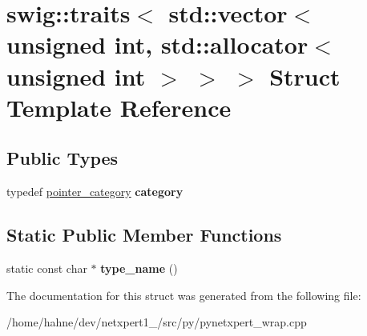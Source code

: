 \hypertarget{structswig_1_1traits_3_01std_1_1vector_3_01unsigned_01int_00_01std_1_1allocator_3_01unsigned_01int_01_4_01_4_01_4}{}\section{swig\+:\+:traits$<$ std\+:\+:vector$<$ unsigned int, std\+:\+:allocator$<$ unsigned int $>$ $>$ $>$ Struct Template Reference}
\label{structswig_1_1traits_3_01std_1_1vector_3_01unsigned_01int_00_01std_1_1allocator_3_01unsigned_01int_01_4_01_4_01_4}
\subsection*{Public Types}
\begin{DoxyCompactItemize}
\item 
typedef \hyperlink{structswig_1_1pointer__category}{pointer\+\_\+category} {\bfseries category}\hypertarget{structswig_1_1traits_3_01std_1_1vector_3_01unsigned_01int_00_01std_1_1allocator_3_01unsigned_01int_01_4_01_4_01_4_aeab6866fea6fdef88297666f7adad894}{}\label{structswig_1_1traits_3_01std_1_1vector_3_01unsigned_01int_00_01std_1_1allocator_3_01unsigned_01int_01_4_01_4_01_4_aeab6866fea6fdef88297666f7adad894}

\end{DoxyCompactItemize}
\subsection*{Static Public Member Functions}
\begin{DoxyCompactItemize}
\item 
static const char $\ast$ {\bfseries type\+\_\+name} ()\hypertarget{structswig_1_1traits_3_01std_1_1vector_3_01unsigned_01int_00_01std_1_1allocator_3_01unsigned_01int_01_4_01_4_01_4_a0e9f798ec32a232c0528ea030b19c137}{}\label{structswig_1_1traits_3_01std_1_1vector_3_01unsigned_01int_00_01std_1_1allocator_3_01unsigned_01int_01_4_01_4_01_4_a0e9f798ec32a232c0528ea030b19c137}

\end{DoxyCompactItemize}


The documentation for this struct was generated from the following file\+:\begin{DoxyCompactItemize}
\item 
/home/hahne/dev/netxpert1\+\_/src/py/pynetxpert\+\_\+wrap.\+cpp\end{DoxyCompactItemize}
